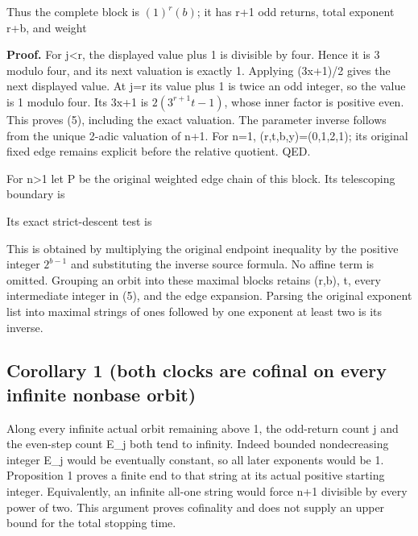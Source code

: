 
Thus the complete block is \((1)^r(b)\); it has r+1 odd returns, total
exponent r+b, and weight


\textbf{Proof.} For j\textless r, the displayed value plus 1 is
divisible by four. Hence it is 3 modulo four, and its next valuation is
exactly 1. Applying (3x+1)/2 gives the next displayed value. At j=r its
value plus 1 is twice an odd integer, so the value is 1 modulo four. Its
3x+1 is \(2(3^{r+1}t-1)\), whose inner factor is positive even. This
proves (5), including the exact valuation. The parameter inverse follows
from the unique 2-adic valuation of n+1. For n=1, (r,t,b,y)=(0,1,2,1);
its original fixed edge remains explicit before the relative quotient.
QED.

For n\textgreater1 let P be the original weighted edge chain of this
block. Its telescoping boundary is


Its exact strict-descent test is


This is obtained by multiplying the original endpoint inequality by the
positive integer \(2^{b-1}\) and substituting the inverse source
formula. No affine term is omitted. Grouping an orbit into these maximal
blocks retains (r,b), t, every intermediate integer in (5), and the edge
expansion. Parsing the original exponent list into maximal strings of
ones followed by one exponent at least two is its inverse.

\subsection{Corollary 1 (both clocks are cofinal on every infinite
nonbase orbit)}

Along every infinite actual orbit remaining above 1, the odd-return
count j and the even-step count E\_j both tend to infinity. Indeed
bounded nondecreasing integer E\_j would be eventually constant, so all
later exponents would be 1. Proposition 1 proves a finite end to that
string at its actual positive starting integer. Equivalently, an
infinite all-one string would force n+1 divisible by every power of two.
This argument proves cofinality and does not supply an upper bound for
the total stopping time.

